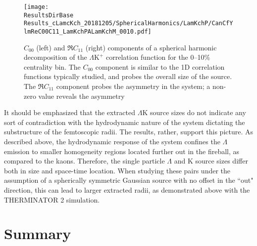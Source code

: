 \documentclass[ALICE,manyauthors]{cernphprep}
\newcommand{\ResultsDirBase}{/home/jesse/Analysis/FemtoAnalysis/Results/}
\newcommand{\Lam}{$\Lambda$\xspace}
\newcommand{\LamK}{$\Lambda$K\xspace}
\newcommand{\LamKchP}{$\Lambda\mathrm{K^{+}}$\xspace}
\begin{document}
\begin{figure}[h!]
  \centering
  \texttt{[image: \\ResultsDirBase Results\_cLamcKch\_20181205/SphericalHarmonics/LamKchP/CanCfYlmReC00C11\_LamKchPALamKchM\_0010.pdf]}
  \caption[\LamKchP $C_{00}$ and $\Re C_{11}$ Spherical Harmonic Components (0--10\%)]{$C_{00}$ (left) and $\Re C_{11}$ (right) components of a spherical harmonic decomposition of the \LamKchP correlation function for the 0--10\% centrality bin.  
The $C_{00}$ component is similar to the 1D correlation functions typically studied, and probes the overall size of the source.
The $\Re C_{11}$ component probes the asymmetry in the system; a non-zero value reveals the asymmetry}
  \label{fig:LamKchP_ReC00C11_0010}
\end{figure}

It should be emphasized that the extracted \LamK source sizes do not indicate any sort of contradiction with the hydrodynamic nature of the system dictating the substructure of the femtoscopic radii.
The results, rather, support this picture.
As described above, the hydrodynamic response of the system confines the \Lam emission to smaller homogeneity regions located further out in the fireball, as compared to the kaons.
Therefore, the single particle \Lam and K source sizes differ both in size and space-time location.
When studying these pairs under the assumption of a spherically symmetric Gaussian source with no offset in the ``out" direction, this can lead to larger extracted radii, as demonstrated above with the THERMINATOR 2 simulation.

\section{Summary}
\label{sec:Summary}
\end{document}
